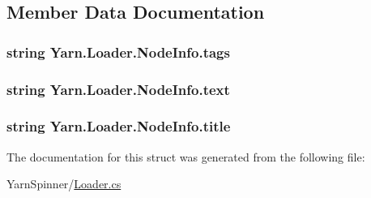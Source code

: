 \subsection{Member Data Documentation}
\hypertarget{a00056_acd4d4915f6cc14f8b0f1f92d27da8b36}{
\subsubsection[{tags}]{\setlength{\rightskip}{0pt plus 5cm}string Yarn.\-Loader.\-Node\-Info.\-tags}}\label{a00056_acd4d4915f6cc14f8b0f1f92d27da8b36}
\hypertarget{a00056_a63d7ebed8095a20fc5d0d74c84a34f6c}{
\subsubsection[{text}]{\setlength{\rightskip}{0pt plus 5cm}string Yarn.\-Loader.\-Node\-Info.\-text}}\label{a00056_a63d7ebed8095a20fc5d0d74c84a34f6c}
\hypertarget{a00056_aafc45bbc86a9acb9bdbcf7877695a96c}{
\subsubsection[{title}]{\setlength{\rightskip}{0pt plus 5cm}string Yarn.\-Loader.\-Node\-Info.\-title}}\label{a00056_aafc45bbc86a9acb9bdbcf7877695a96c}


The documentation for this struct was generated from the following file\-:\begin{DoxyCompactItemize}
\item 
Yarn\-Spinner/\hyperlink{a00121}{Loader.\-cs}\end{DoxyCompactItemize}
